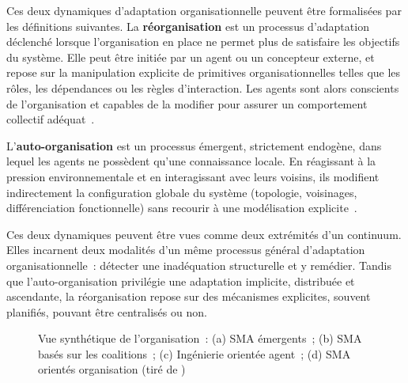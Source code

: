 Ces deux dynamiques d'adaptation organisationnelle peuvent être formalisées par les définitions suivantes. La \textbf{réorganisation} est un processus d'adaptation déclenché lorsque l'organisation en place ne permet plus de satisfaire les objectifs du système. Elle peut être initiée par un agent ou un concepteur externe, et repose sur la manipulation explicite de primitives organisationnelles telles que les rôles, les dépendances ou les règles d'interaction. Les agents sont alors conscients de l'organisation et capables de la modifier pour assurer un comportement collectif adéquat~\cite{Picard2009reorganisation}.

L'\textbf{auto-organisation} est un processus émergent, strictement endogène, dans lequel les agents ne possèdent qu'une connaissance locale. En réagissant à la pression environnementale et en interagissant avec leurs voisins, ils modifient indirectement la configuration globale du système (topologie, voisinages, différenciation fonctionnelle) sans recourir à une modélisation explicite~\cite{Picard2009reorganisation}.

Ces deux dynamiques peuvent être vues comme deux extrémités d'un continuum. Elles incarnent deux modalités d'un même processus général d'adaptation organisationnelle~: détecter une inadéquation structurelle et y remédier. Tandis que l'auto-organisation privilégie une adaptation implicite, distribuée et ascendante, la réorganisation repose sur des mécanismes explicites, souvent planifiés, pouvant être centralisés ou non.

\begin{figure}[h]
  \centering
  \resizebox{\textwidth}{!}{%
    
  }
  \caption{Vue synthétique de l'organisation~: (a) SMA émergents~; (b) SMA basés sur les coalitions~; (c) Ingénierie orientée agent~; (d) SMA orientés organisation (tiré de \cite{Picard2009reorganisation})}
  \label{fig:auto_vs_topdown}
\end{figure}



